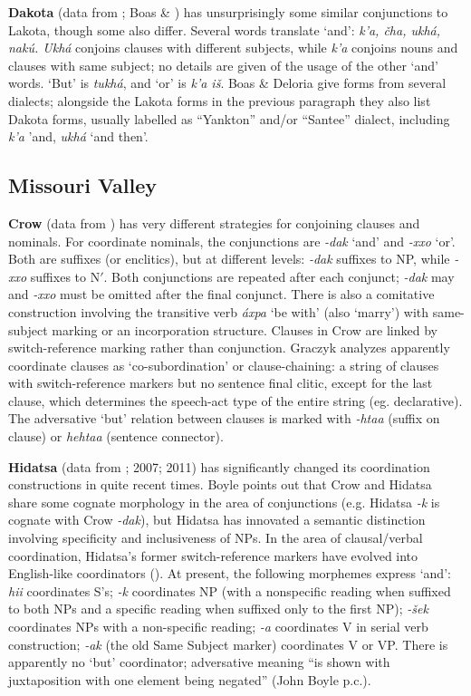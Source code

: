 \documentclass[output=paper]{LSP/langsci}
\begin{document}
\textbf{Dakota} (data from \citealt{Riggs1851}; Boas \& \citealt{Deloria1941}) has unsurprisingly some similar conjunctions to Lakota, though some also differ. Several words translate `and': \textit{k'a, \v{c}ha, ukh\'a, nak\'u. Ukh\'a} conjoins clauses with different subjects, while \textit{k'a} conjoins nouns and clauses with same subject; no details are given of the usage of the other `and' words. `But' is \textit{tukh\'a}, and `or' is \textit{k'a i\v{s}}. Boas \& Deloria give forms from several dialects; alongside the Lakota forms in the previous paragraph they also list Dakota forms, usually labelled as ``Yankton'' and/or ``Santee'' dialect, including \textit{k'a} 'and, \textit{ukh\'a} `and then'.     

\subsection{Missouri Valley}
 
\textbf{Crow} (data from \citealt{Graczyk2007}) has very different strategies for conjoining clauses and
nominals. For coordinate nominals, the conjunctions are \textit{-dak} `and' and \textit{-xxo} `or'. Both are suffixes (or enclitics), but at different levels: \textit{-dak} suffixes to NP, while \textit{-xxo} suffixes to N$'$. Both conjunctions are repeated after each conjunct; \textit{-dak} may and \textit{-xxo} must be omitted after the final conjunct. There is also a comitative construction involving the transitive verb \textit{\'axpa} `be with' (also `marry') with same-subject marking or an incorporation structure. Clauses in Crow are linked by switch-reference marking rather than conjunction. Graczyk analyzes apparently coordinate clauses as `co-subordination' or clause-chaining: a string of clauses with switch-reference markers but no sentence final clitic, except for the last clause, which determines the speech-act type of the entire string (eg. declarative). The adversative `but' relation between clauses is marked with \textit{-htaa} (suffix on clause) or \textit{hehtaa} (sentence connector).

\textbf{Hidatsa} (data from \citealt{Boyle2005}; 2007; 2011) has significantly changed its coordination constructions in quite recent times. Boyle points out that Crow and Hidatsa share some cognate morphology in the area of conjunctions (e.g. Hidatsa \textit{-k} is cognate with Crow \textit{-dak}), but Hidatsa has innovated a semantic distinction involving specificity and inclusiveness of NPs. In the area of clausal/verbal coordination, Hidatsa's former switch-reference markers have evolved into English-like coordinators (\citealt{Boyle2011}). At present, the following morphemes express `and': \textit{hii} coordinates S's; \textit{-k} coordinates NP (with a nonspecific reading when suffixed to both NPs and a specific reading when suffixed only to the first NP); \textit{-\v{s}ek} coordinates NPs with a non-specific reading; \textit{-a} coordinates V in serial verb construction; \textit{-ak} (the old Same Subject marker) coordinates V or VP. There is apparently no `but' coordinator; adversative meaning ``is shown with juxtaposition with one element being negated'' (John Boyle p.c.).
\end{document}
